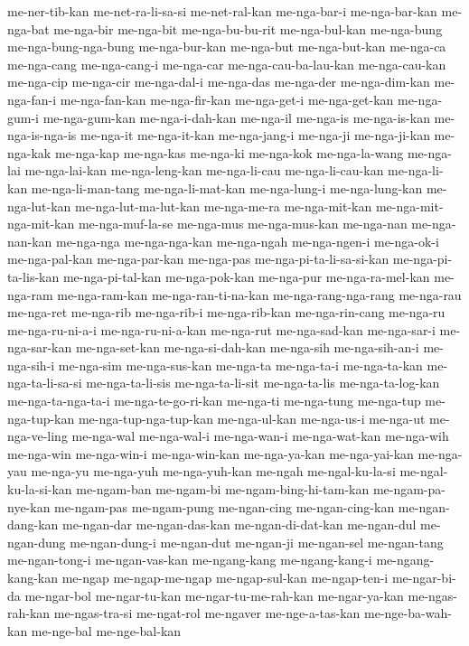 {me-ner-tib-kan me-net-ra-li-sa-si me-net-ral-kan me-nga-bar-i
me-nga-bar-kan me-nga-bat me-nga-bir me-nga-bit me-nga-bu-bu-rit
me-nga-bul-kan me-nga-bung me-nga-bung-nga-bung me-nga-bur-kan me-nga-but
me-nga-but-kan me-nga-ca me-nga-cang me-nga-cang-i me-nga-car
me-nga-cau-ba-lau-kan me-nga-cau-kan me-nga-cip me-nga-cir me-nga-dal-i
me-nga-das me-nga-der me-nga-dim-kan me-nga-fan-i me-nga-fan-kan
me-nga-fir-kan me-nga-get-i me-nga-get-kan me-nga-gum-i me-nga-gum-kan
me-nga-i-dah-kan me-nga-il me-nga-is me-nga-is-kan me-nga-is-nga-is
me-nga-it me-nga-it-kan me-nga-jang-i me-nga-ji me-nga-ji-kan me-nga-kak
me-nga-kap me-nga-kas me-nga-ki me-nga-kok me-nga-la-wang me-nga-lai
me-nga-lai-kan me-nga-leng-kan me-nga-li-cau me-nga-li-cau-kan
me-nga-li-kan me-nga-li-man-tang me-nga-li-mat-kan me-nga-lung-i
me-nga-lung-kan me-nga-lut-kan me-nga-lut-ma-lut-kan me-nga-me-ra
me-nga-mit-kan me-nga-mit-nga-mit-kan me-nga-muf-la-se me-nga-mus
me-nga-mus-kan me-nga-nan me-nga-nan-kan me-nga-nga me-nga-nga-kan
me-nga-ngah me-nga-ngen-i me-nga-ok-i me-nga-pal-kan me-nga-par-kan
me-nga-pas me-nga-pi-ta-li-sa-si-kan me-nga-pi-ta-lis-kan
me-nga-pi-tal-kan me-nga-pok-kan me-nga-pur me-nga-ra-mel-kan me-nga-ram
me-nga-ram-kan me-nga-ran-ti-na-kan me-nga-rang-nga-rang me-nga-rau
me-nga-ret me-nga-rib me-nga-rib-i me-nga-rib-kan me-nga-rin-cang
me-nga-ru me-nga-ru-ni-a-i me-nga-ru-ni-a-kan me-nga-rut me-nga-sad-kan
me-nga-sar-i me-nga-sar-kan me-nga-set-kan me-nga-si-dah-kan me-nga-sih
me-nga-sih-an-i me-nga-sih-i me-nga-sim me-nga-sus-kan me-nga-ta
me-nga-ta-i me-nga-ta-kan me-nga-ta-li-sa-si me-nga-ta-li-sis
me-nga-ta-li-sit me-nga-ta-lis me-nga-ta-log-kan me-nga-ta-nga-ta-i
me-nga-te-go-ri-kan me-nga-ti me-nga-tung me-nga-tup me-nga-tup-kan
me-nga-tup-nga-tup-kan me-nga-ul-kan me-nga-us-i me-nga-ut me-nga-ve-ling
me-nga-wal me-nga-wal-i me-nga-wan-i me-nga-wat-kan me-nga-wih me-nga-win
me-nga-win-i me-nga-win-kan me-nga-ya-kan me-nga-yai-kan me-nga-yau
me-nga-yu me-nga-yuh me-nga-yuh-kan me-ngah me-ngal-ku-la-si
me-ngal-ku-la-si-kan me-ngam-ban me-ngam-bi me-ngam-bing-hi-tam-kan
me-ngam-pa-nye-kan me-ngam-pas me-ngam-pung me-ngan-cing me-ngan-cing-kan
me-ngan-dang-kan me-ngan-dar me-ngan-das-kan me-ngan-di-dat-kan
me-ngan-dul me-ngan-dung me-ngan-dung-i me-ngan-dut me-ngan-ji me-ngan-sel
me-ngan-tang me-ngan-tong-i me-ngan-vas-kan me-ngang-kang me-ngang-kang-i
me-ngang-kang-kan me-ngap me-ngap-me-ngap me-ngap-sul-kan me-ngap-ten-i
me-ngar-bi-da me-ngar-bol me-ngar-tu-kan me-ngar-tu-me-rah-kan
me-ngar-ya-kan me-ngas-rah-kan me-ngas-tra-si me-ngat-rol me-ngaver
me-nge-a-tas-kan me-nge-ba-wah-kan me-nge-bal me-nge-bal-kan
}
